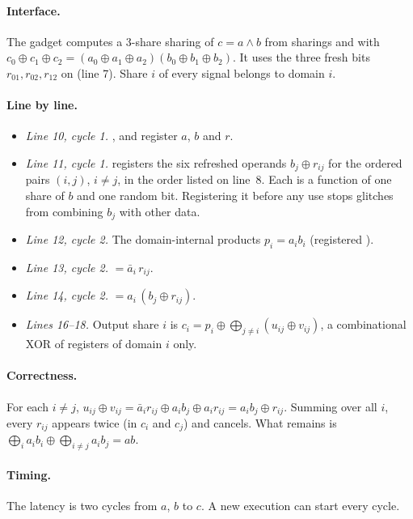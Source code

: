\paragraph{Interface.} The gadget computes a 3-share sharing of $c = a \wedge b$ from sharings  and  with $c_0 \oplus c_1 \oplus c_2 = (a_0 \oplus a_1 \oplus a_2)(b_0 \oplus b_1 \oplus b_2)$. It uses the three fresh bits $r_{01}, r_{02}, r_{12}$ on  (line 7). Share $i$ of every signal belongs to domain $i$.

\paragraph{Line by line.}
\begin{itemize}
  \item \emph{Line 10, cycle 1.} ,  and  register $a$, $b$ and $r$.
  \item \emph{Line 11, cycle 1.}  registers the six refreshed operands $b_j \oplus r_{ij}$ for the ordered pairs $(i, j)$, $i \ne j$, in the order listed on line~8. Each is a function of one share of $b$ and one random bit. Registering it before any use stops glitches from combining $b_j$ with other data.
  \item \emph{Line 12, cycle 2.} The domain-internal products $p_i = a_i b_i$ (registered ).
  \item \emph{Line 13, cycle 2.}  $= \bar a_i\, r_{ij}$.
  \item \emph{Line 14, cycle 2.}  $= a_i\,(b_j \oplus r_{ij})$.
  \item \emph{Lines 16--18.} Output share $i$ is $c_i = p_i \oplus \bigoplus_{j \ne i} (u_{ij} \oplus v_{ij})$, a combinational XOR of registers of domain $i$ only.
\end{itemize}

\paragraph{Correctness.} For each $i \ne j$, $u_{ij} \oplus v_{ij} = \bar a_i r_{ij} \oplus a_i b_j \oplus a_i r_{ij} = a_i b_j \oplus r_{ij}$. Summing over all $i$, every $r_{ij}$ appears twice (in $c_i$ and $c_j$) and cancels. What remains is $\bigoplus_i a_i b_i \oplus \bigoplus_{i \ne j} a_i b_j = ab$.

\paragraph{Timing.} The latency is two cycles from $a$, $b$ to $c$. A new execution can start every cycle.

